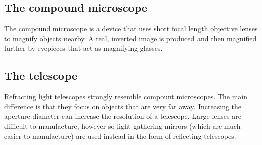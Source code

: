 \documentclass[12pt]{report}
\begin{document}
\subsection{The compound microscope}
The compound microscope is a device that uses short focal length objective lenses to magnify objects nearby. A real, inverted image is produced and then magnified further by eyepieces that act as magnifying glasses. 


\subsection{The telescope}
Refracting light telescopes strongly resemble compount microscopes. The main difference is that they focus on objects that are very far away. Increasing the aperture diameter can increase the resolution of a telescope. Large lenses are difficult to manufacture, however so light-gathering mirrors (which are much easier to manufacture) are used instead in the form of reflecting telescopes. 
\end{document}
